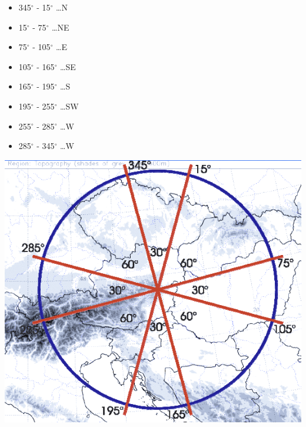 \begin{minipage}{.5\linewidth}
    \begin{itemize}
        \item 345$^{\circ}$ -   15$^{\circ}$  \dots   N
        \item 15$^{\circ}$  -   75$^{\circ}$    \dots NE
        \item 75$^{\circ}$  -   105$^{\circ}$    \dots E
        \item 105$^{\circ}$  -   165$^{\circ}$    \dots SE
        \item 165$^{\circ}$  -   195$^{\circ}$    \dots S
        \item 195$^{\circ}$  -   255$^{\circ}$    \dots SW
        \item 255$^{\circ}$  -   285$^{\circ}$    \dots W
        \item 285$^{\circ}$  -   345$^{\circ}$    \dots W
    \end{itemize}
    \end{minipage}
    \hfill
    \begin{minipage}{.5\linewidth}
    \centering
    \includegraphics[width=\linewidth]{Figures/figures_methods/windesctors.png}
    \end{minipage}


